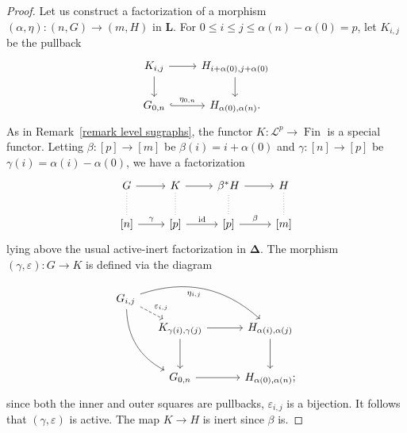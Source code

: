 \documentclass{amsart}
\numberwithin{theorem}{subsection}
\theoremstyle{definition}
\newcommand{\finset}{\operatorname{Fin}}
\newcommand{\id}{\operatorname{id}}
\newcommand{\simp}{\mathbf{\Delta}}
\newcommand{\levelg}{\mathbf{L}}
\newcommand{\scriptyell}{\mathscr L}
\begin{document}
\begin{proof}
Let us construct a factorization of a morphism $(\alpha, \eta)\colon (n,G) \to (m,H)$ in $\levelg$.
For $0\leq i \leq j \leq \alpha(n) - \alpha(0) = p$, let $K_{i,j}$ be the pullback
\[
\begin{tikzcd}
K_{i,j} \rar \dar & H_{i+\alpha(0),j+\alpha(0)} \dar \\
G_{0,n} \rar[hook, "\eta_{0,n}"] & H_{\alpha(0),\alpha(n)}.
\end{tikzcd}
\]
As in Remark~\ref{remark level sugraphs}, the functor $K\colon \scriptyell^p \to \finset$ is a special functor.
Letting $\beta \colon [p] \to [m]$ be $ \beta(i) = i + \alpha(0)$ and $\gamma \colon [n] \to [p]$ be $\gamma(i) = \alpha(i) - \alpha(0)$, we have a factorization
\[ \begin{tikzcd}
G \rar \dar[dotted,no head] & K \rar \dar[dotted,no head] & \beta^*H \rar \dar[dotted,no head] & H \dar[dotted,no head] \\
{[n]} \rar["\gamma"] & {[p]} \rar["\id"] & {[p]} \rar["\beta"] & {[m]}
\end{tikzcd} \]
lying above the usual active-inert factorization in $\simp$.
The morphism $(\gamma, \varepsilon)\colon G \to K$ is defined via the diagram
\[ \begin{tikzcd}[column sep=small, row sep=small]
G_{i,j} \arrow[dr, dashed, "\varepsilon_{i,j}"]
\arrow[drr, bend left, "\eta_{i,j}" swap]
\arrow[ddr, bend right]
& &[1.8em]
 \\
&
K_{\gamma(i),\gamma(j)} \rar\dar & H_{\alpha(i),\alpha(j)}\dar \\[1.8em]
&
G_{0,n} \rar & H_{\alpha(0),\alpha(n)};
\end{tikzcd} \]
since both the inner and outer squares are pullbacks, $\varepsilon_{i,j}$ is a bijection.
It follows that $(\gamma, \varepsilon)$ is active.
The map $K \to H$ is inert since $\beta$ is.


\end{proof}
\end{document}
